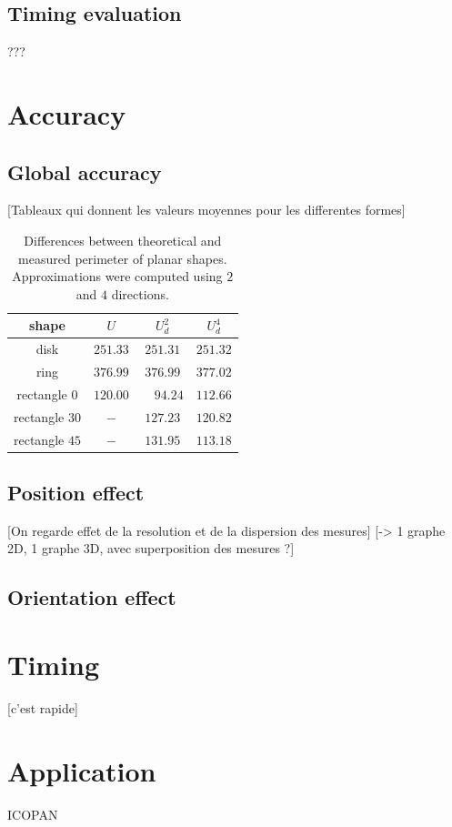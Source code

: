 \documentclass{InsightArticle}
\begin{document}
\subsection{Timing evaluation}

???

\section{Accuracy}

\subsection{Global accuracy}

[Tableaux qui donnent les valeurs moyennes pour les differentes formes]

%
\begin{table}[!htb]
\begin{center}
\begin{tabular}{|c|c|c|c|} \hline 
shape		    & $U$		& $U_d^2$ & $U_d^4$		\tabularnewline \hline
disk		    & $251.33$	& $251.31$ 	& $251.32$ 	\tabularnewline
ring		    & $376.99$	& $376.99$ 	& $377.02$	\tabularnewline
rectangle  $0$ 	& $120.00$ 	&\ \ $94.24$& $112.66$	\tabularnewline
rectangle $30$  & $-$ 		& $127.23$	& $120.82$	\tabularnewline
rectangle $45$  & $-$ 		& $131.95$	& $113.18$	\tabularnewline
\hline
\end{tabular}\end{center}
\caption{\label{tab:Validate-Perimeter}
Differences between theoretical and measured perimeter of planar shapes.
Approximations were computed using $2$ and $4$ directions.
}
\end{table}

\subsection{Position effect}

[On regarde effet de la resolution et de la dispersion des mesures]
[-> 1 graphe 2D, 1 graphe 3D, avec superposition des mesures ?]

\subsection{Orientation effect}


\section{Timing}

[c'est rapide]

\section{Application}

ICOPAN


\appendix





\nocite{ITKSoftwareGuide}
\end{document}
